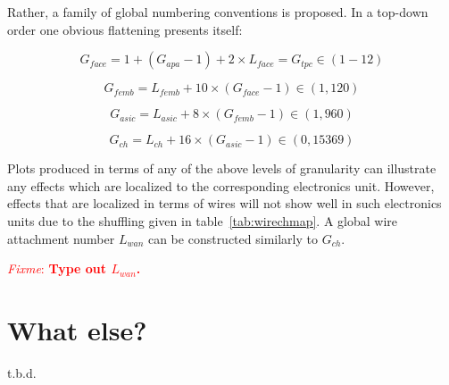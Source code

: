 \documentclass[pdftex,12pt,letter]{article}
\newcommand{\fixme}[1]{\textcolor{red}{\textit{Fixme}: \textbf{#1}}}
\begin{document}
Rather, a family of global numbering conventions is proposed.  In a
top-down order one obvious flattening presents itself:

\[  G_{face} = 1 + (G_{apa}-1) + 2\times L_{face} = G_{tpc} \in (1-12) \]
  
\[  G_{femb} = L_{femb} + 10\times (G_{face}-1) \in (1,120) \]

\[  G_{asic} = L_{asic} + 8\times (G_{femb}-1) \in (1,960) \]

\[ G_{ch} = L_{ch} + 16\times (G_{asic}-1) \in (0,15369) \]

Plots produced in terms of any of the above levels of granularity can
illustrate any effects which are localized to the corresponding
electronics unit.  However, effects that are localized in terms of
wires will not show well in such electronics units due to the
shuffling given in table~\ref{tab:wirechmap}.  A global wire
attachment number $L_{wan}$ can be constructed similarly to $G_{ch}$.

\fixme{Type out $L_{wan}$.}

\section{What else?}

t.b.d.
\end{document}
